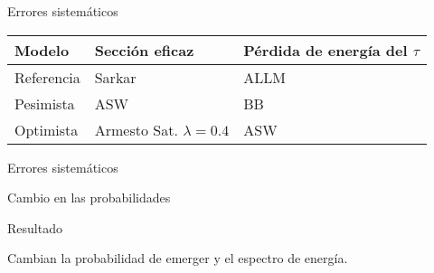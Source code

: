 \begin{frame}{Errores sistem\'aticos}
	\begin{block}{}
		\begin{center}
			\hspace{2mm}
		\end{center}
	\end{block}
	\begin{exampleblock}{}
		\begin{center}
			\begin{tabular}{|l|l|l|}
			\hline
			\textbf{Modelo}      & Secci\'on eficaz& P\'erdida de energ\'ia del $\tau$ \\ 
			\hline
			Referencia &    Sarkar     & ALLM\\ 
			Pesimista &  ASW &     BB\\ 
			Optimista &   Armesto Sat. $\lambda=0.4$&  ASW\\
			\hline 
			\end{tabular}  
		\end{center}
	\end{exampleblock}
\end{frame}

\begin{frame}{Errores sistem\'aticos}
	\begin{block}{Cambio en las probabilidades}
		\begin{center}
		\end{center}
	\end{block}
	\begin{exampleblock}{Resultado}
		\begin{center}
			Cambian la probabilidad de emerger y el espectro de energ\'ia.
		\end{center}
	\end{exampleblock}
\end{frame}